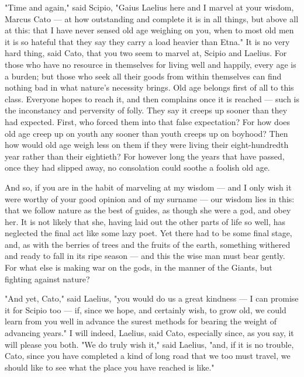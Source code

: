  "Time and again," said Scipio, "Gaius Laelius here and I marvel at your wisdom, Marcus Cato — at how outstanding and complete it is in all things, but above all at this: that I have never sensed old age weighing on you, when to most old men it is so hateful that they say they carry a load heavier than Etna." It is no very hard thing, said Cato, that you two seem to marvel at, Scipio and Laelius. For those who have no resource in themselves for living well and happily, every age is a burden; but those who seek all their goods from within themselves can find nothing bad in what nature's necessity brings. Old age belongs first of all to this class. Everyone hopes to reach it, and then complains once it is reached — such is the inconstancy and perversity of folly. They say it creeps up sooner than they had expected. First, who forced them into that false expectation? For how does old age creep up on youth any sooner than youth creeps up on boyhood? Then how would old age weigh less on them if they were living their eight-hundredth year rather than their eightieth? For however long the years that have passed, once they had slipped away, no consolation could soothe a foolish old age.

 And so, if you are in the habit of marveling at my wisdom — and I only wish it were worthy of your good opinion and of my surname — our wisdom lies in this: that we follow nature as the best of guides, as though she were a god, and obey her. It is not likely that she, having laid out the other parts of life so well, has neglected the final act like some lazy poet. Yet there had to be some final stage, and, as with the berries of trees and the fruits of the earth, something withered and ready to fall in its ripe season — and this the wise man must bear gently. For what else is making war on the gods, in the manner of the Giants, but fighting against nature?

 "And yet, Cato," said Laelius, "you would do us a great kindness — I can promise it for Scipio too — if, since we hope, and certainly wish, to grow old, we could learn from you well in advance the surest methods for bearing the weight of advancing years." I will indeed, Laelius, said Cato, especially since, as you say, it will please you both. "We do truly wish it," said Laelius, "and, if it is no trouble, Cato, since you have completed a kind of long road that we too must travel, we should like to see what the place you have reached is like."

